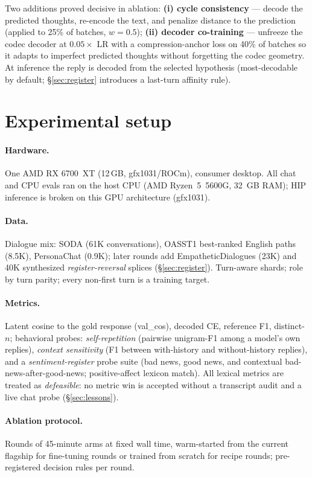 \documentclass[11pt]{article}
\begin{document}
Two additions proved decisive in ablation:
\textbf{(i) cycle consistency} --- decode the predicted thoughts, re-encode
the text, and penalize distance to the prediction (applied to 25\% of
batches, $w{=}0.5$); \textbf{(ii) decoder co-training} --- unfreeze the codec
decoder at $0.05\times$ LR with a compression-anchor loss on 40\% of batches
so it adapts to imperfect predicted thoughts without forgetting the codec
geometry. At inference the reply is decoded from the selected hypothesis
(most-decodable by default; \S\ref{sec:register} introduces a last-turn
affinity rule).

\section{Experimental setup}
\label{sec:setup}

\paragraph{Hardware.} One AMD RX 6700~XT (12\,GB, gfx1031/ROCm), consumer
desktop. All chat and CPU evals ran on the host CPU (AMD Ryzen~5~5600G,
32~GB RAM); HIP inference is broken on this GPU architecture (gfx1031).

\paragraph{Data.} Dialogue mix: SODA (61K conversations), OASST1 best-ranked
English paths (8.5K), PersonaChat (0.9K); later rounds add
EmpatheticDialogues (23K) and 40K synthesized \emph{register-reversal}
splices (\S\ref{sec:register}). Turn-aware shards; role by turn parity; every
non-first turn is a training target.

\paragraph{Metrics.} Latent cosine to the gold response (val\_cos), decoded
CE, reference F1, distinct-$n$; behavioral probes: \emph{self-repetition}
(pairwise unigram-F1 among a model's own replies), \emph{context
sensitivity} (F1 between with-history and without-history replies),
and a \emph{sentiment-register} probe suite (bad news, good news, and
contextual bad-news-after-good-news; positive-affect lexicon match).
All lexical metrics are treated as \emph{defeasible}: no metric win is
accepted without a transcript audit and a live chat probe
(\S\ref{sec:lessons}).

\paragraph{Ablation protocol.} Rounds of 45-minute arms at fixed wall time,
warm-started from the current flagship for fine-tuning rounds or trained
from scratch for recipe rounds; pre-registered decision rules per round.
\end{document}
